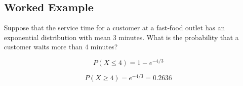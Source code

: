 \documentclass[a4paper,12pt]{article}
\begin{document}
\subsection*{Worked Example}
Suppose that the service time for a customer at a fast-food outlet
has an exponential distribution with mean 3 minutes. What is the probability that a
customer waits more than 4 minutes?

\[ P(X  \leq 4) = 1 -  e^{-4/3} \]

\[ P(X  \geq 4) = e^{-4/3} = 0.2636 \]

\end{document}
